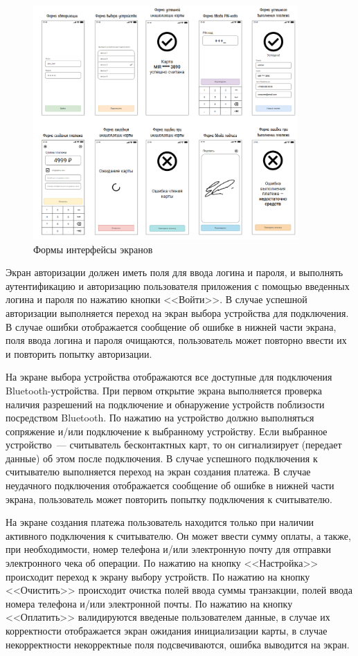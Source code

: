 \begin{figure}[H]
    \centering
    \includegraphics[width=0.9\textwidth]{images/design/screens}
    \caption{\centering Формы интерфейсы экранов}
    \label{fig:screens}
\end{figure}

Экран авторизации должен иметь поля для ввода логина и пароля, и выполнять аутентификацию и авторизацию пользователя приложения с помощью введенных логина и пароля по нажатию кнопки <<Войти>>.
В случае успешной авторизации выполняется переход на экран выбора устройства для подключения.
В случае ошибки отображается сообщение об ошибке в нижней части экрана, поля ввода логина и пароля очищаются, пользователь может повторно ввести их и повторить попытку авторизации.

На экране выбора устройства отображаются все доступные для подключения Bluetooth-устройства.
При первом открытие экрана выполняется проверка наличия разрешений на подключение и обнаружение устройств поблизости посредством Bluetooth.
По нажатию на устройство должно выполняться сопряжение и/или подключение к выбранному устройству.
Если выбранное устройство~--- считыватель бесконтактных карт, то он сигнализирует (передает данные) об этом после подключения.
В случае успешного подключения к считывателю выполняется переход на экран создания платежа.
В случае неудачного подключения отображается сообщение об ошибке в нижней части экрана, пользователь может повторить попытку подключения к считывателю.

На экране создания платежа пользователь находится только при наличии активного подключения к считывателю.
Он может ввести сумму оплаты, а также, при необходимости, номер телефона и/или электронную почту для отправки электронного чека об операции.
По нажатию на кнопку <<Настройка>> происходит переход к экрану выбору устройств.
По нажатию на кнопку <<Очистить>> происходит очистка полей ввода суммы транзакции, полей ввода номера телефона и/или электронной почты.
По нажатию на кнопку <<Оплатить>> валидируются введеные пользователем данные, в случае их корректности отображается экран ожидания инициализации карты, в случае некорректности некорректные поля подсвечиваются, ошибка выводится на экран.

